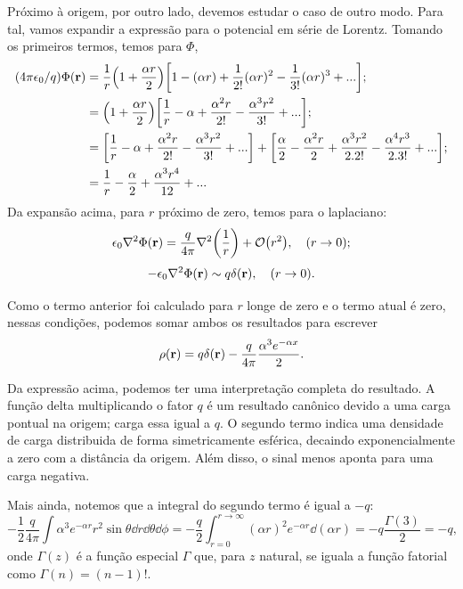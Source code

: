 Próximo à origem, por outro lado, devemos estudar o caso de outro modo. Para tal, vamos expandir a expressão para o potencial em série de Lorentz. Tomando os primeiros termos, temos para $\Phi$,
\begin{align*}
  (4 \pi \epsilon_0/q) \Phi(\vb{r})
  &= \frac{1}{r} \qty(1 + \frac{\alpha r}{2}) \qty[ 1 - (\alpha r) + \frac{1}{2!} (\alpha r)^2 - \frac{1}{3!} (\alpha r)^3 + ...  ];
  \\ &= \qty(1 + \frac{\alpha r}{2}) \qty[\frac{1}{r} - \alpha + \frac{\alpha^2 r}{2!} - \frac{\alpha^3 r^2}{3!} + ...];
  \\ &= \qty[\frac{1}{r} - \alpha + \frac{\alpha^2 r}{2!} - \frac{\alpha^3 r^2}{3!} + ...]  +  \qty[\frac{\alpha}{2} - \frac{\alpha^2 r}{2} + \frac{\alpha^3 r^2}{2.2!} - \frac{\alpha^4 r^3}{2.3!} + ...];
  \\ &= \frac{1}{r} - \frac{\alpha}{2} + \frac{\alpha^3 r^4}{12} + ...
\end{align*}
Da expansão acima, para $r$ próximo de zero, temos para o laplaciano:
\begin{equation*}
  \epsilon_0 \laplacian{\Phi(\vb{r})} = \frac{q}{4\pi} \laplacian{\qty(\frac{1}{r})} + \order{r^2}, \quad (r \to 0);
\end{equation*}
\begin{equation*}
  - \epsilon_0 \laplacian{\Phi(\vb{r})} \sim q \delta(\vb{r}), \quad (r \to 0).
\end{equation*}

Como o termo anterior foi calculado para $r$ longe de zero e o termo atual é zero, nessas condições, podemos somar ambos os resultados para escrever
\begin{equation*}
  \rho(\vb{r}) = q \delta(\vb{r}) - \frac{q}{4\pi} \frac{\alpha^3 e^{-\alpha x}}{2}.
\end{equation*}

Da expressão acima, podemos ter uma interpretação completa do resultado. A função delta multiplicando o fator $q$ é um resultado canônico devido a uma carga pontual na origem; carga essa igual a $q$. O segundo termo indica uma densidade de carga distribuida de forma simetricamente esférica, decaindo exponencialmente a zero com a distância da origem. Além disso, o sinal menos aponta para uma carga negativa.

Mais ainda, notemos que a integral do segundo termo é igual a $-q$:
\begin{equation*}
  -\frac{1}{2} \frac{q}{4\pi} \int \alpha^3 e^{-\alpha r} r^2 \sin \theta \dd{r} \dd{\theta} \dd{\phi} = -\frac{q}{2} \int_{r = 0}^{r \to \infty} (\alpha r)^2 e^{-\alpha r} \dd{(\alpha r)} = -q \frac{\Gamma(3)}{2} = -q,
\end{equation*}
onde $\Gamma(z)$ é a função especial $\Gamma$ que, para $z$ natural, se iguala a função fatorial como $\Gamma(n) = (n-1)!$.













